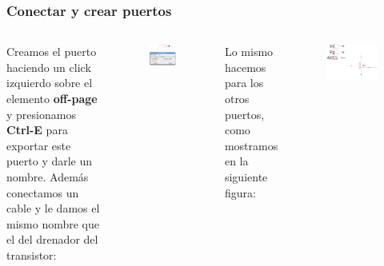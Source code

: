 \documentclass{beamer}
\begin{document}
\begin{frame}
\frametitle{Conectar y crear puertos}
\begin{columns}[t]
Creamos el puerto haciendo un click izquierdo sobre el elemento \textbf{off-page} y presionamos \textbf{Ctrl-E} para exportar este puerto y darle un nombre. Además conectamos un cable y le damos el mismo nombre que el del drenador del transistor:
\begin{figure}
  \includegraphics[width=0.90\linewidth]{figuras/edicionElectric-4e.png}
\end{figure}
Lo mismo hacemos para los otros puertos, como mostramos en la siguiente figura:
\begin{figure}
\includegraphics[width=1.25\linewidth]{figuras/edicionElectric-4f.png}
\end{figure}
\end{columns}
\end{frame}
\end{document}
